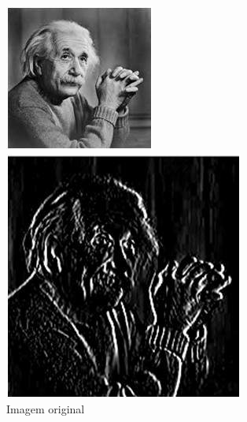 \documentclass[a4paper, 12pt]{article}
\begin{document}
\begin{figure}[!htb]
	\centering
	  	\includegraphics[width=\linewidth]{images/einstein256.jpg}
	  	\caption{Imagem original}
	\endminipage\hspace{1cm}
		\includegraphics[width=\linewidth]{images/sobelvert.jpg}

\end{figure}
\end{document}
